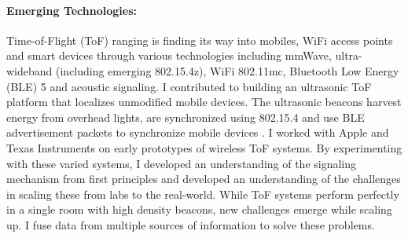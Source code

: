 \documentclass[11pt]{article}
\begin{document}
\paragraph{Emerging Technologies: }
Time-of-Flight (ToF) ranging is finding its way into mobiles, WiFi access points and smart devices through various technologies including mmWave, ultra-wideband (including emerging 802.15.4z), WiFi 802.11mc, Bluetooth Low Energy (BLE) 5 and acoustic signaling.  I contributed to building an ultrasonic ToF platform that localizes unmodified mobile devices. The ultrasonic beacons harvest energy from overhead lights, are synchronized using 802.15.4 and use BLE advertisement packets to synchronize mobile devices \cite{rtas-alps-platform, lazik2015alps,lazik2015alpsdemo}. I worked with Apple and Texas Instruments on early prototypes of wireless ToF systems. 
By experimenting with these varied systems, I developed an understanding of the signaling mechanism from first principles and developed an understanding of the challenges in scaling these from labs to the real-world. %
While ToF systems perform perfectly in a single room with high density beacons, new challenges emerge while scaling up.  %
I fuse data from multiple sources of information to solve these problems. %
\end{document}
